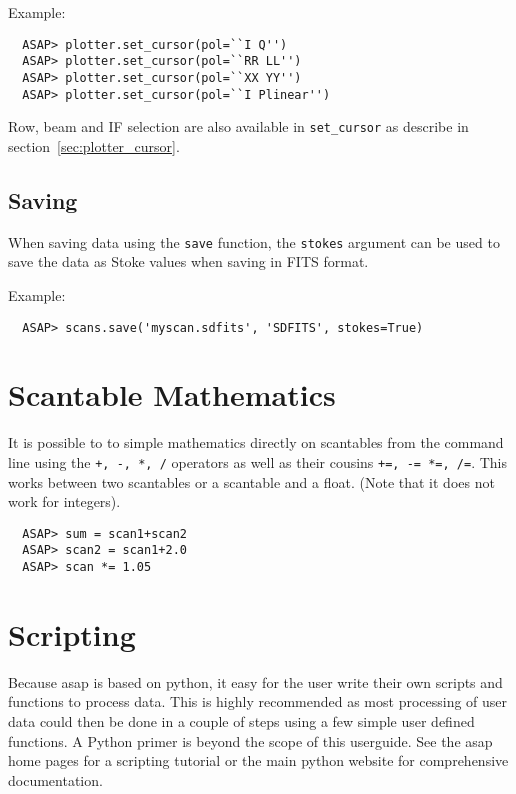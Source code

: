 \documentclass[11pt]{article}
\newcommand{\cmd}[1]{{\tt #1}}
\begin{document}
Example:

\begin{verbatim}
  ASAP> plotter.set_cursor(pol=``I Q'')
  ASAP> plotter.set_cursor(pol=``RR LL'')
  ASAP> plotter.set_cursor(pol=``XX YY'')
  ASAP> plotter.set_cursor(pol=``I Plinear'')
\end{verbatim}

Row, beam and IF selection are also available in \cmd{set\_cursor} as
describe in section~\ref{sec:plotter_cursor}.

\subsection{Saving}

When saving data using the \cmd{save} function, the \cmd{stokes}
argument can be used to save the data as Stoke values when saving in
FITS format.

Example:

\begin{verbatim}
  ASAP> scans.save('myscan.sdfits', 'SDFITS', stokes=True)
\end{verbatim}


\section{Scantable Mathematics}

It is possible to to simple mathematics directly on scantables from
the command line using the \cmd{+, -, *, /} operators as well as their
cousins \cmd{+=, -= *=, /=}. This works between two scantables or a
scantable and a float. (Note that it does not work for integers).

\begin{verbatim}
  ASAP> sum = scan1+scan2
  ASAP> scan2 = scan1+2.0
  ASAP> scan *= 1.05
\end{verbatim}

\section{Scripting}

Because asap is based on python, it easy for the user write their own
scripts and functions to process data. This is highly recommended as
most processing of user data could then be done in a couple of steps
using a few simple user defined functions. A Python primer is beyond
the scope of this userguide. See the asap home pages for a scripting
tutorial or the main python website for comprehensive documentation.
\end{document}
